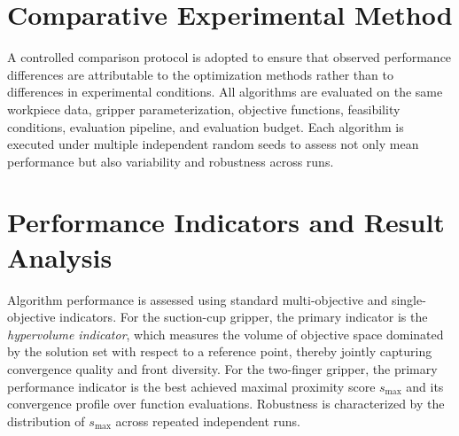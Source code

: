 \section{Comparative Experimental Method}
\label{sec:methodology_comparative_experiments}

A controlled comparison protocol is adopted to ensure that observed performance differences are attributable to the optimization methods rather than
to differences in experimental conditions. All algorithms are evaluated on the same workpiece data, gripper parameterization, objective functions,
feasibility conditions, evaluation pipeline, and evaluation budget. Each algorithm is executed under multiple independent random seeds to assess not
only mean performance but also variability and robustness across runs.

\section{Performance Indicators and Result Analysis}
\label{sec:methodology_analysis}

Algorithm performance is assessed using standard multi-objective and single-objective indicators. For the suction-cup gripper, the primary indicator
is the \emph{hypervolume indicator}, which measures the volume of objective space dominated by the solution set with respect to a reference point,
thereby jointly capturing convergence quality and front diversity. For the two-finger gripper, the primary performance indicator is the best achieved
maximal proximity score $s_{\max}$ and its convergence profile over function evaluations. Robustness is characterized by the distribution of
$s_{\max}$ across repeated independent runs.
